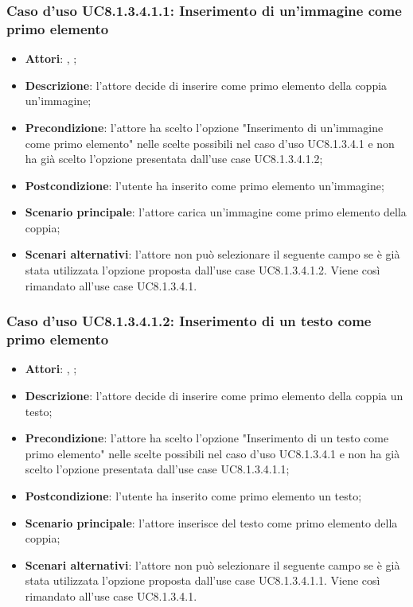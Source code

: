 		\subsubsection{Caso d'uso UC8.1.3.4.1.1: Inserimento di un'immagine come primo elemento}
		\label{UC8.1.3.4.1.1}
		\begin{itemize}
			\item \textbf{Attori}: \uau, \uaupro;
			\item \textbf{Descrizione}: l'attore decide di inserire come primo elemento della coppia un'immagine;
			\item \textbf{Precondizione}: l'attore ha scelto l'opzione "Inserimento di un'immagine come primo elemento" nelle scelte possibili nel caso d'uso UC8.1.3.4.1 e non ha già scelto l'opzione presentata dall'use case UC8.1.3.4.1.2;
			\item \textbf{Postcondizione}: l'utente ha inserito come primo elemento un'immagine;
			\item \textbf{Scenario principale}: l'attore carica un'immagine come primo elemento della coppia;  
			\item \textbf{Scenari alternativi}: l'attore non può selezionare il seguente campo se è già stata utilizzata l'opzione proposta dall'use case UC8.1.3.4.1.2. Viene così rimandato all'use case UC8.1.3.4.1.
		\end{itemize}
		
		\subsubsection{Caso d'uso UC8.1.3.4.1.2: Inserimento di un testo come primo elemento}
		\label{UC8.1.3.4.1.2}
		\begin{itemize}
			\item \textbf{Attori}: \uau, \uaupro;
			\item \textbf{Descrizione}: l'attore decide di inserire come primo elemento della coppia un testo;
			\item \textbf{Precondizione}: l'attore ha scelto l'opzione "Inserimento di un testo come primo elemento" nelle scelte possibili nel caso d'uso UC8.1.3.4.1 e non ha già scelto l'opzione presentata dall'use case UC8.1.3.4.1.1;
			\item \textbf{Postcondizione}: l'utente ha inserito come primo elemento un testo;
			\item \textbf{Scenario principale}: l'attore inserisce del testo come primo elemento della coppia;  
			\item \textbf{Scenari alternativi}: l'attore non può selezionare il seguente campo se è già stata utilizzata l'opzione proposta dall'use case UC8.1.3.4.1.1. Viene così rimandato all'use case UC8.1.3.4.1.
		\end{itemize}
		
